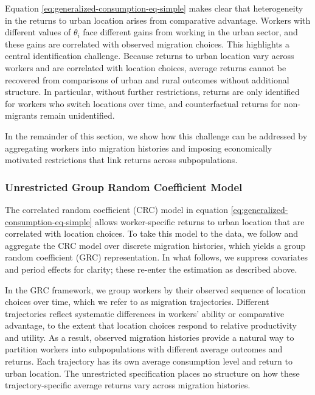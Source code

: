 \documentclass[12pt]{article}
\begin{document}
Equation \eqref{eq:generalized-consumption-eq-simple} makes clear that heterogeneity in the returns to urban location arises from comparative advantage. 
Workers with different values of $\theta_{i}$ face different gains from working in the urban sector, and these gains are correlated with observed migration choices. 
This highlights a central identification challenge.
Because returns to urban location vary across workers and are correlated with location choices, average returns cannot be recovered from comparisons of urban and rural outcomes without additional structure.
In particular, without further restrictions, returns are only identified for workers who switch locations over time, and counterfactual returns for non-migrants remain unidentified.

In the remainder of this section, we show how this challenge can be addressed by aggregating workers into migration histories and imposing economically motivated restrictions that link returns across subpopulations.


\subsubsection{Unrestricted Group Random Coefficient Model}\label{subsec:unrestricted-grc-model}
The correlated random coefficient (CRC) model in equation \eqref{eq:generalized-consumption-eq-simple} allows worker-specific returns to urban location that are correlated with location choices. 
To take this model to the data, we follow \cite{tjernstromCommentSuri2011} and aggregate the CRC model over discrete migration histories, which yields a  group random coefficient (GRC) representation.
In what follows, we suppress covariates and period effects for clarity; these re-enter the estimation as described above. 

In the GRC framework, we group workers by their observed sequence of location choices over time, which we refer to as migration trajectories.
Different trajectories reflect systematic differences in workers' ability or comparative advantage, to the extent that location choices respond to relative productivity and utility.
As a result, observed migration histories provide a natural way to partition workers into subpopulations with different average outcomes and returns.
Each trajectory has its own average consumption level and return to urban location.
The unrestricted specification places no structure on how these trajectory-specific average returns vary across migration histories.
\end{document}
